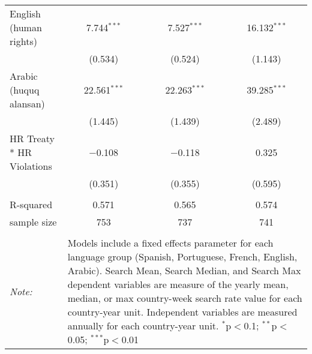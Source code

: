 \begin{table}[!htbp]
\begin{tabular}{@{\extracolsep{5pt}}lccc}
  English (human rights) & 7.744$^{***}$ & 7.527$^{***}$ & 16.132$^{***}$ \\ 
  & (0.534) & (0.524) & (1.143) \\ 
  Arabic (huquq alansan) & 22.561$^{***}$ & 22.263$^{***}$ & 39.285$^{***}$ \\ 
  & (1.445) & (1.439) & (2.489) \\ 
  HR Treaty * HR Violations & $-$0.108 & $-$0.118 & 0.325 \\ 
  & (0.351) & (0.355) & (0.595) \\ 
 \hline \\[-1.8ex] 
R-squared  & 0.571 & 0.565 & 0.574 \\ 
sample size  & 753 & 737 & 741 \\ 
\hline 
\hline \\[-1.8ex] 
\textit{Note:}  & \multicolumn{3}{l}{\parbox[t]{8cm}{Models include a fixed effects parameter for each language group (Spanish, Portuguese, French, English, Arabic). Search Mean, Search Median, and Search Max dependent variables are measure of the yearly mean, median, or max country-week search rate value for each country-year unit. Independent variables are measured annually for each country-year unit. $^{*}$p$<$0.1; $^{**}$p$<$0.05; $^{***}$p$<$0.01}} \\ 
\end{tabular} 
\end{table} 
